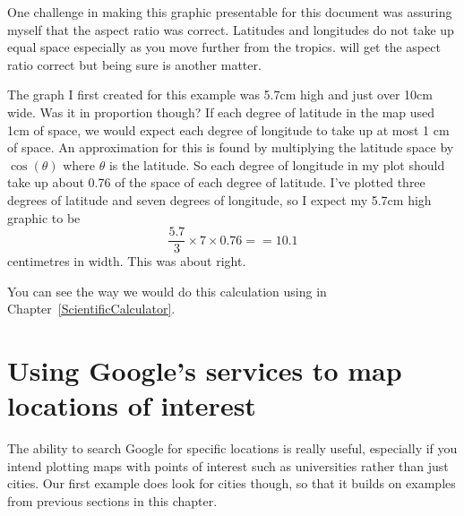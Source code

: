 One challenge in making this graphic presentable for this document 
was assuring myself that the aspect ratio was correct. Latitudes and longitudes do not take up equal space especially as you move further from the tropics. \R{} will get the aspect ratio correct but being sure is another matter. 

The graph I first created for this example was 5.7cm high and just over 10cm wide. Was it in proportion though? If each degree of latitude in the map used 1cm of space, we would expect each degree of longitude to take up at most 1 cm of space. An approximation for this is found by multiplying the latitude space by $\cos(\theta)$ where $\theta$ is the latitude. So each degree of longitude in my plot should take up about 0.76 of the space of each degree of latitude. I've plotted three degrees of latitude and seven degrees of longitude, so I expect my 5.7cm high graphic to be 
$$ \frac{5.7}{3} \times 7 \times 0.76 == 10.1 $$
centimetres in width. This was about right. 

You can see the way we would do this calculation using \R{} in Chapter~\ref{ScientificCalculator}.


\section{Using Google's services to map locations of interest}

The ability to search Google for specific locations is really useful, especially if you intend plotting maps with points of interest such as universities rather than just cities. Our first example does look for cities though, so that it builds on examples from previous sections in this chapter.

